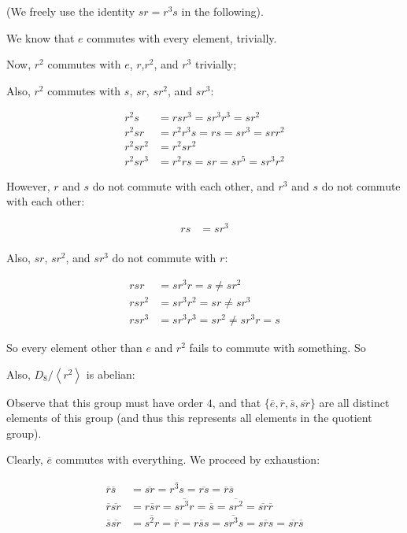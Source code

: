 \documentclass[a4paper,12pt]{article}
\newcommand{\tab}{\hspace{4mm}} %
\newcommand{\anbrack}[1]{\left\langle #1 \right\rangle}
\begin{document}
\tab (We freely use the identity $sr = r^3s$ in the following).

\tab \tab We know that $e$ commutes with every element, trivially.

\tab \tab Now, $r^2$ commutes with $e$, $r$,$r^2$, and $r^3$ trivially; %

\tab \tab Also, $r^2$ commutes with $s$, $sr$, $sr^2$, and $sr^3$:

\begin{align*}
r^2s &= rsr^3 = sr^3r^3 = sr^2\\
r^2sr &= r^2r^3s = rs = sr^3 = srr^2 \\ 
r^2sr^2 &= r^2sr^2\\
r^2sr^3 &= r^2rs = sr = sr^5=sr^3r^2
\end{align*}

\tab \tab However, $r$ and $s$ do not commute with each other, and $r^3$ and $s$ do not commute with each other:

\begin{align*}
rs &= sr^3\\
\end{align*}

\tab \tab Also, $sr$, $sr^2$, and $sr^3$ do not commute with $r$:

\begin{align*}
rsr &= sr^3r = s \neq sr^2\\
rsr^2 &= sr^3r^2 = sr \neq sr^3 \\
rsr^3 &= sr^3r^3 = sr^2 \neq sr^3r = s
\end{align*}

\tab \tab So every element other than $e$ and $r^2$ fails to commute with something.
So 

\tab Also, $D_8/\anbrack{r^2}$ is abelian:

\tab \tab Observe that this group must have order $4$, and that $\{\overline{e},\overline{r}, \overline{s}, \overline{sr}\}$ are all distinct elements of this group (and thus this represents all elements in the quotient group).

\tab \tab Clearly, $\overline{e}$ commutes with everything. We proceed by exhaustion:

\begin{align*}
\overline{r}\overline{s} &= \overline{sr} = \overline{r^3s} = \overline{rs} = \overline{r}\overline{s}\\
\overline{r}\overline{sr} &= \overline{rsr} = \overline{sr^3r} = \overline{s} = \overline{sr^2} = \overline{sr}\overline{r}\\
\overline{s}\overline{sr} &= \overline{s^2r} = \overline{r} = \overline{rss} = \overline{sr^3s} = \overline{srs} = \overline{sr}\overline{s}\\
\end{align*}
\end{document}
